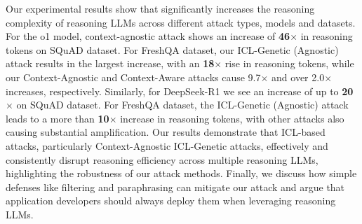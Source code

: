Our experimental results show that \sys significantly increases the reasoning complexity of reasoning LLMs across different attack types, models and datasets. For the o1 model, context-agnostic attack shows an increase of \textbf{46}$\times$ in reasoning tokens on SQuAD dataset. For FreshQA dataset, our ICL-Genetic (Agnostic) attack results in the largest increase, with an \textbf{18}$\times$ rise in reasoning tokens, while our Context-Agnostic and Context-Aware attacks cause 9.7$\times$ and over 2.0$\times$ increases, respectively. Similarly, for  DeepSeek-R1 we see an increase of up to \textbf{20}$\times$ on SQuAD dataset. For FreshQA dataset, the ICL-Genetic (Agnostic) attack leads to a more than \textbf{10}$\times$ increase in reasoning tokens, with other attacks also causing substantial amplification. Our results demonstrate that ICL-based attacks, particularly Context-Agnostic ICL-Genetic attacks, effectively and consistently disrupt reasoning efficiency across multiple reasoning LLMs, highlighting the robustness of our attack methods.
Finally, we discuss how simple defenses like filtering and paraphrasing can mitigate our attack and argue that application developers should always deploy them when leveraging reasoning LLMs.



 






